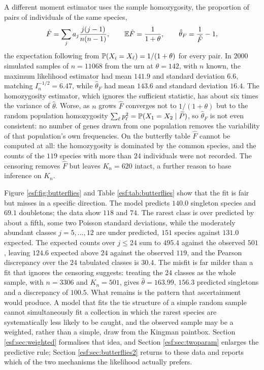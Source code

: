 \begin{example}
A different moment estimator uses the sample homozygosity, the proportion of pairs
of individuals of the same species,
\[
\hat F = \sum_{j} a_j \frac{j(j-1)}{n(n-1)}, \qquad \mathbb{E} \hat F = \frac{1}{1+\theta},
\qquad \hat\theta_F = \frac{1}{\hat F} - 1,
\]
the expectation following from $\mathbb{P}(X_i = X_\ell) = 1/(1+\theta)$ for every pair. In
$2000$ simulated samples of $n = 11068$ from the urn at $\theta = 142$, with $n$ known, the maximum
likelihood estimator had mean $141.9$ and standard deviation $6.6$, matching
$I_n^{-1/2} = 6.47$, while $\hat\theta_F$ had mean $143.6$ and standard deviation
$16.4$. The homozygosity estimator, which ignores the sufficient statistic, has about
six times the variance of $\hat\theta$. Worse, as $n$ grows $\hat F$ converges not
to $1/(1+\theta)$ but to the random population homozygosity
$\sum_\ell p_\ell^{2} = \mathbb{P}(X_1 = X_2 \mid \widetilde{P})$, so $\hat\theta_F$ is not even
consistent: no number of genes drawn from one population removes the variability of
that population's own frequencies. On
the butterfly table $\hat F$ cannot be computed at all: the homozygosity is dominated by the common
species, and the counts of the $119$ species with more than $24$ individuals were not recorded. The censoring removes $\hat F$ but leaves $K_n = 620$ intact, a further reason to
base inference on $K_n$.
\end{example}

Figure \ref{esf:fig:butterflies} and Table \ref{esf:tab:butterflies} show that the fit is fair but
misses in a specific direction. The model predicts $140.0$ singleton species and
$69.1$ doubletons; the data show $118$ and $74$. The rarest class is over predicted by
about a fifth, some two Poisson standard deviations, while the moderately abundant classes $j = 5, \dots, 12$ are under predicted, $151$ species against $131.0$ expected. The
expected counts over $j \le 24$ sum to $495.4$ against the observed $501$, leaving $124.6$ expected above $24$ against the observed $119$, and the Pearson discrepancy over the $24$ tabulated classes is $30.4$. The misfit is far milder than a fit that ignores the censoring suggests: treating the $24$ classes as the whole sample, with $n = 3306$ and $K_n = 501$, gives $\hat\theta = 163.99$, $156.3$ predicted singletons and a discrepancy of $100.5$. What remains is the pattern that ascertainment would produce. A model that fits the
tie structure of a simple random sample cannot simultaneously fit a collection in
which the rarest species are systematically less likely to be caught, and the observed sample may be a weighted, rather than a simple,
draw from the Kingman paintbox. Section \ref{esf:sec:weighted} formalises that idea, and
Section \ref{esf:sec:twoparam} enlarges the predictive rule; Section
\ref{esf:sec:butterflies2} returns to these data and reports which of the two mechanisms
the likelihood actually prefers.

